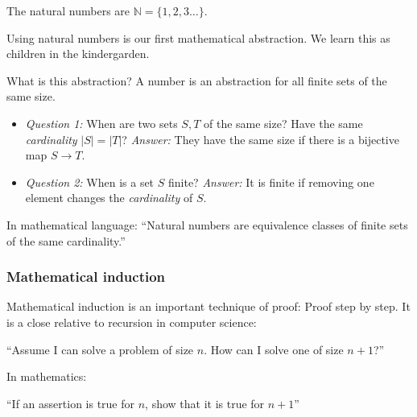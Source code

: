 
The natural numbers are $\mathbb{N} = \{1,2,3 \ldots \}$.

Using natural numbers is our first mathematical abstraction. We learn this as children in the kindergarden. 

What is this abstraction? A number is an abstraction for all finite sets of the same size.

\begin{itemize}
 \item \emph{Question 1:} When are two sets $S,T$ of the same size?  Have the same \emph{cardinality} $|S|=|T|$?
 \emph{Answer:} They have the same size
 if there is a bijective map $S\to T$.
 \item \emph{Question 2:} When is a set $S$ finite? \emph{Answer:}
 It is finite if removing one element changes the \emph{cardinality} of $S$. 
 \white{3cm}{}
\end{itemize}

In mathematical language: ``Natural numbers are equivalence classes of finite sets of the same cardinality.'' 

\subsubsection{Mathematical induction}

Mathematical induction is an important technique of proof: Proof step by step. It is a close relative to 
recursion in computer science:

``Assume I can solve a problem of size $n$. How can I solve one of size $n+1$?''

In mathematics:

``If an assertion is true for $n$, show that it is true for $n+1$''


